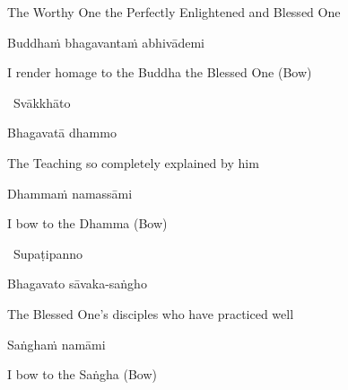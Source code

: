 \begin{english}
  The Worthy One the Perfectly Enlightened and Blessed One
\end{english}

Buddhaṁ bhagavantaṁ abhivādemi

\begin{english}
  I render homage to the Buddha the Blessed One \hfill{\textnormal{\fontsize{12.5}{18}\selectfont (Bow)}}
\end{english}

\begin{leader}
  \anglebracketleft\ \hspace{-0.5mm}Svākkhāto \hspace{-0.5mm}\anglebracketright\
\end{leader}

\vspace{-0.5cm}

Bhagavatā dhammo

\begin{english}
  The Teaching so completely explained by him
\end{english}

Dhammaṁ namassāmi

\begin{english}
  I bow to the Dhamma \hfill{\textnormal{\fontsize{12.5}{18}\selectfont (Bow)}}
\end{english}

\begin{leader}
  \anglebracketleft\ \hspace{-0.5mm}Supaṭipanno \hspace{-0.5mm}\anglebracketright\
\end{leader}

\vspace{-0.5cm}

Bhagavato sāvaka-saṅgho

\begin{english}
  The Blessed One's disciples who have practiced well
\end{english}

Saṅghaṁ namāmi

\begin{english}
  I bow to the Saṅgha \hfill{\textnormal{\fontsize{12.5}{18}\selectfont (Bow)}}\\
\end{english}

\suttaRef{[Thai]}

\null
\vfill

